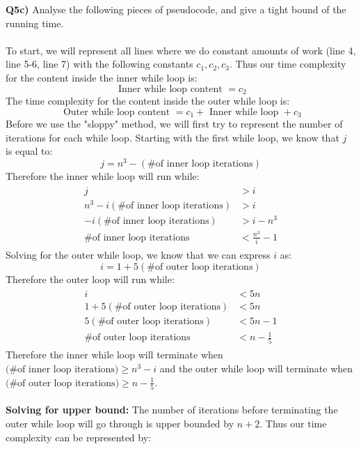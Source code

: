 \documentclass[12pt]{article}
\begin{document}
\newpage
\begin{adjustwidth}{0em}{0pt}
\textbf{Q5c)} Analyse the following pieces of pseudocode, and give a tight bound of the running time. \\ \\
To start, we will represent all lines where we do constant amounts of work (line 4, line 5-6, line 7) with the following constants $c_1, c_2, c_3$. Thus our time complexity for the content inside the inner while loop is:
\[ \text{ Inner while loop content } = c_2 \]
The time complexity for the content inside the outer while loop is:
\[ \text{ Outer while loop content } = c_1 + \text{ Inner while loop } + c_3 \]
Before we use the "sloppy" method, we will first try to represent the number of iterations for each while loop. Starting with the first while loop, we know that $j$ is equal to:
\[ j = n^3 - (\text{\# of inner loop iterations}) \]
Therefore the inner while loop will run while:
\begin{align*}
    \begin{aligned}
       j & > i \\
       n^3 - i(\text{\# of inner loop iterations}) &> i \\
       - i(\text{\# of inner loop iterations}) &> i - n^3 \\
       \text{\# of inner loop iterations} &< \frac{n^3}{i} - 1
    \end{aligned}
\end{align*}
Solving for the outer while loop, we know that we can express $i$ as:
\[ i = 1 + 5 (\text{\# of outer loop iterations}) \]
Therefore the outer loop will run while: 
\begin{align*}
    \begin{aligned}
       i &< 5n \\
       1 + 5 (\text{\# of outer loop iterations}) &< 5n \\
       5 (\text{\# of outer loop iterations}) &< 5n - 1 \\
       \text{\# of outer loop iterations} &< n - \frac{1}{5}
    \end{aligned}
\end{align*}
Therefore the inner while loop will terminate when $\text{(\# of inner loop iterations)} \geq n^3 - i$ and the outer while loop will terminate when $\text{(\# of outer loop iterations)} \geq n - \frac{1}{5}$. \\ \\
\textbf{Solving for upper bound:} The number of iterations before terminating the outer while loop will go through is upper bounded by $n+2$. Thus our time complexity can be represented by:

\end{adjustwidth}
\end{document}
